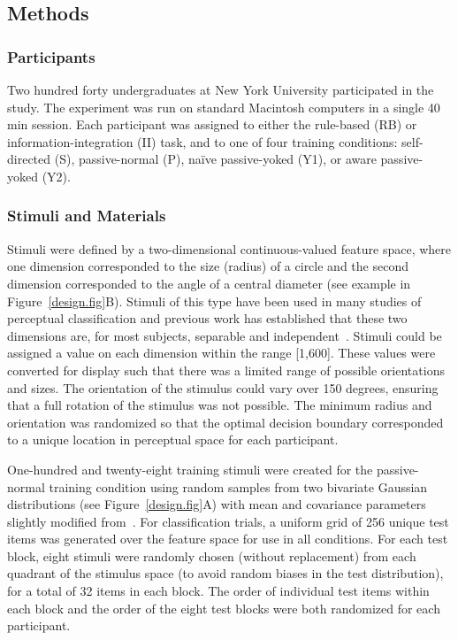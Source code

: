 \documentclass[3p,twocolumn,authoryear,10pt]{elsarticle}
\begin{document}

\subsection{Methods}
 
\subsubsection{Participants}
Two hundred forty undergraduates at New York University participated in the study. The experiment was run on standard Macintosh computers in a single 40 min session. Each participant was assigned to either the rule-based (RB) or information-integration (II) task, and to one of four training conditions: self-directed (S), passive-normal (P), na\"ive passive-yoked (Y1), or aware passive-yoked (Y2).

\subsubsection{Stimuli and Materials}
Stimuli were defined by a two-dimensional continuous-valued feature space, where one dimension corresponded to the size (radius) of a circle and the second dimension corresponded to the angle of a central diameter (see example in Figure~\ref{design.fig}B). Stimuli of this type have been used in many studies of perceptual classification \citep[e.g.,][]{Garner:1970fk,Shepard:1964xf,Nosofsky:1989gu} and previous work has established that these two dimensions are, for most subjects, separable and independent~\citep{Nosofsky:1989gu}.
Stimuli could be assigned a value on each dimension within the range [1,600]. These values were converted for display such that there was a limited range of possible orientations and sizes. The orientation of the stimulus could vary over 150 degrees, ensuring that a full rotation of the stimulus was not possible. The minimum radius and orientation was randomized so that the optimal decision boundary corresponded to a unique location in perceptual space for each participant. 

One-hundred and twenty-eight training stimuli were created for the passive-normal training condition using random samples from two bivariate Gaussian distributions (see Figure~\ref{design.fig}A) with mean and covariance parameters slightly modified from~\citep{Ashby:2002p13331}. For classification trials, a uniform grid of 256 unique test items was generated over the feature space for use in all conditions. For each test block, eight stimuli were randomly chosen (without replacement) from each quadrant of the stimulus space (to avoid random biases in the test distribution), for a total of 32 items in each block. The order of individual test items within each block and the order of the eight test blocks were both randomized for each participant.
\end{document}
